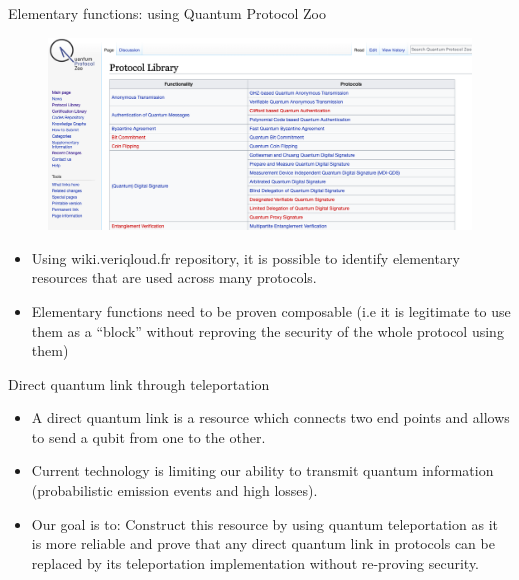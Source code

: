 \documentclass[final]{beamer}
\newlength{\twocolwid}
\begin{document}
\begin{frame}[t]
\begin{columns}[t]
\begin{column}{\twocolwid}
\begin{columns}[t,totalwidth=\twocolwid]
\begin{column}{\twocolwid}
\begin{block}{Elementary functions: using Quantum Protocol Zoo}

\begin{figure}
   \includegraphics[width=0.90\linewidth]{Protocol_Zoo.png}
\end{figure}

\begin{itemize}
\item Using wiki.veriqloud.fr repository, it is possible to identify elementary resources that are used across many protocols.
\item Elementary functions need to be proven composable (i.e it is legitimate to use them as a “block” without reproving the security of the whole protocol using them)


\end{itemize}
\end{block}


\begin{block}{Direct quantum link through teleportation}
   \begin{itemize}
       \item A direct quantum link is a resource which connects two end points and allows to send a qubit from one to the other.
       \item Current technology is limiting our ability to transmit quantum information (probabilistic emission events and high losses).
      \item Our goal is to: Construct this resource by using quantum teleportation as it is more reliable and prove that any direct quantum link in protocols can be replaced by its teleportation implementation without re-proving security.

   \end{itemize}
 

\end{block}
\end{column}
\end{columns}
\end{column}
\end{columns}
\end{frame}
\end{document}

